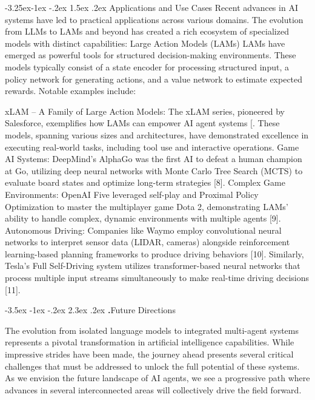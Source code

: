 \documentclass[journal,twoside,10pt]{IEEEtran}
\makeatletter
\renewcommand\section{\@startsection{section}{1}{\z@}%
                       {-3.5ex \@plus -1ex \@minus -.2ex}%
                       {2.3ex \@plus.2ex}%
                       {\normalfont\Large\bfseries\Roman{section}.\quad}}
\renewcommand\subsection{\@startsection{subsection}{2}{\z@}%
                       {-3.25ex\@plus -1ex \@minus -.2ex}%
                       {1.5ex \@plus .2ex}%
                       {\normalfont\large\bfseries}}
\makeatother
\begin{document}
\subsection{Applications and Use Cases}
Recent advances in AI systems have led to practical applications across various domains. The evolution from LLMs to LAMs and beyond has created a rich ecosystem of specialized models with distinct capabilities:
Large Action Models (LAMs)
LAMs have emerged as powerful tools for structured decision-making environments. These models typically consist of a state encoder for processing structured input, a policy network for generating actions, and a value network to estimate expected rewards. Notable examples include:

xLAM – A Family of Large Action Models: The xLAM series, pioneered by Salesforce, exemplifies how LAMs can empower AI agent systems [\cite{zhang2024xlam}. These models, spanning various sizes and architectures, have demonstrated excellence in executing real-world tasks, including tool use and interactive operations.
Game AI Systems: DeepMind's AlphaGo was the first AI to defeat a human champion at Go, utilizing deep neural networks with Monte Carlo Tree Search (MCTS) to evaluate board states and optimize long-term strategies [8].
Complex Game Environments: OpenAI Five leveraged self-play and Proximal Policy Optimization to master the multiplayer game Dota 2, demonstrating LAMs' ability to handle complex, dynamic environments with multiple agents [9].
Autonomous Driving: Companies like Waymo employ convolutional neural networks to interpret sensor data (LIDAR, cameras) alongside reinforcement learning-based planning frameworks to produce driving behaviors [10]. Similarly, Tesla's Full Self-Driving system utilizes transformer-based neural networks that process multiple input streams simultaneously to make real-time driving decisions [11].

\section{Future Directions}


The evolution from isolated language models to integrated multi-agent systems represents a pivotal transformation in artificial intelligence capabilities. While impressive strides have been made, the journey ahead presents several critical challenges that must be addressed to unlock the full potential of these systems. As we envision the future landscape of AI agents, we see a progressive path where advances in several interconnected areas will collectively drive the field forward.
\end{document}
